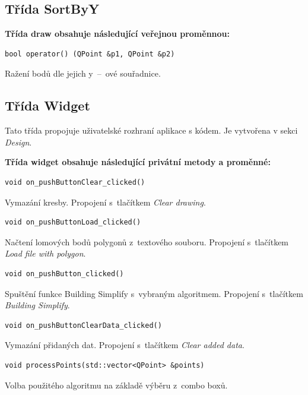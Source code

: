 \documentclass[a4paper, 12pt, oneside, titlepage]{article} %
\begin{document}
\subsection{Třída SortByY}
\textbf{Třída draw obsahuje následující veřejnou proměnnou:}
\begin{verbatim}
bool operator() (QPoint &p1, QPoint &p2)
\end{verbatim}
Ražení bodů dle jejich y~--~ové souřadnice.\\

\subsection{Třída Widget}
Tato třída propojuje uživatelské rozhraní aplikace s kódem. Je vytvořena v sekci \emph{Design}.

\textbf{Třída widget obsahuje následující privátní metody a proměnné:}
\begin{verbatim}
void on_pushButtonClear_clicked()
\end{verbatim}
Vymazání kresby. Propojení s~tlačítkem \emph{Clear drawing}.\\

\begin{verbatim}
void on_pushButtonLoad_clicked()
\end{verbatim}
Načtení lomových bodů polygonů z~textového souboru. Propojení s~tlačítkem \emph{Load file with polygon}.\\

\begin{verbatim}
void on_pushButton_clicked()
\end{verbatim}
Spuštění funkce Building Simplify s~vybraným algoritmem. Propojení s~tlačítkem \emph{Building Simplify}.\\

\begin{verbatim}
void on_pushButtonClearData_clicked()
\end{verbatim}
Vymazání přidaných dat. Propojení s~tlačítkem \emph{Clear added data}.\\

\begin{verbatim}
void processPoints(std::vector<QPoint> &points)
\end{verbatim}
Volba použitého algoritmu na základě výběru z~combo boxů.\\
\end{document}
